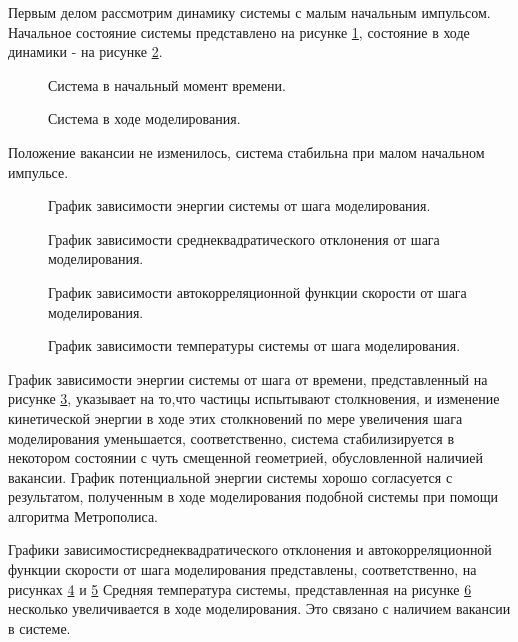 \documentclass[14pt,a4paper,report]{ncc}
\begin{document}
Первым делом рассмотрим динамику системы с малым начальным импульсом.
Начальное состояние системы представлено на рисунке \ref{ris:image10}, состояние в ходе динамики - на рисунке \ref{ris:image11}. 
\

\begin{figure}[b]
\caption{Система в начальный момент времени.}
\label{ris:image10}
\end{figure}
\begin{figure}[h]
\caption{Система в ходе моделирования.}
\label{ris:image11}
\end{figure}
Положение вакансии не изменилось, система стабильна при малом начальном импульсе.
\begin{figure}[h!]
\caption{График зависимости энергии системы от шага моделирования.}
\label{ris:image12}
\end{figure}
\begin{figure}[h!]
\caption{График зависимости среднеквадратического отклонения от шага моделирования.}
\label{ris:image13}
\end{figure}
\begin{figure}[h!]
\caption{График зависимости автокорреляционной функции скорости от шага моделирования.}
\label{ris:image14}
\end{figure}
\begin{figure}[h!]
\caption{График зависимости температуры системы от шага моделирования.}
\label{ris:image15}
\end{figure}
График зависимости энергии системы от шага от времени, представленный на рисунке \ref{ris:image12}, указывает на то,что частицы испытывают столкновения, и изменение кинетической энергии в ходе этих столкновений по мере увеличения шага моделирования уменьшается, соответственно, система стабилизируется в некотором состоянии с чуть смещенной геометрией, обусловленной наличией вакансии. График потенциальной энергии системы хорошо согласуется с результатом, полученным в ходе моделирования подобной системы при помощи алгоритма Метрополиса. 
\

Графики зависимостисреднеквадратического отклонения и автокорреляционной функции скорости от шага моделирования представлены, соответственно, на рисунках \ref{ris:image13} и \ref{ris:image14}
Средняя температура системы, представленная на рисунке \ref{ris:image15} несколько увеличивается в ходе моделирования. Это связано с наличием вакансии в системе.
\
\end{document}
